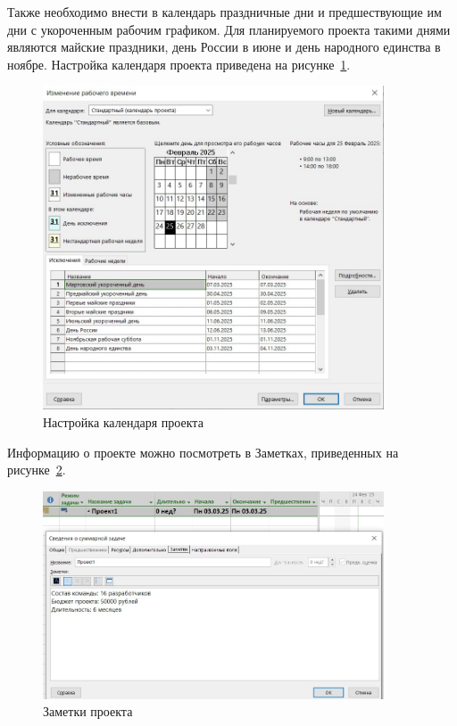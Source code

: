 Также необходимо внести в календарь праздничные дни и предшествующие им дни с укороченным рабочим графиком.
Для планируемого проекта такими днями являются майские праздники, день России в июне и день народного единства в ноябре.
Настройка календаря проекта приведена на рисунке~\ref{fig:calendar}.

\begin{figure}[H]
	\centering
	\includegraphics[width=0.9\textwidth]{img/task1/calendar.jpg}
	\caption{Настройка календаря проекта}
	\label{fig:calendar}
\end{figure}

Информацию о проекте можно посмотреть в Заметках, приведенных на рисунке~\ref{fig:notes}.

\begin{figure}[H]
	\centering
	\includegraphics[width=0.9\textwidth]{img/task1/notes.jpg}
	\caption{Заметки проекта}
	\label{fig:notes}
\end{figure}

